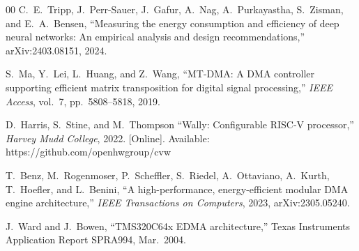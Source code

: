 \documentclass[conference]{IEEEtran}
\begin{document}
\begin{thebibliography}{00}
    C.~E.~Tripp, J.~Perr-Sauer, J.~Gafur, A.~Nag, A.~Purkayastha,
    S.~Zisman, and E.~A.~Bensen, ``Measuring the energy consumption and
    efficiency of deep neural networks: An empirical analysis and design
    recommendations,'' arXiv:2403.08151, 2024.

    S.~Ma, Y.~Lei, L.~Huang, and Z.~Wang, ``MT-DMA: A DMA controller
    supporting efficient matrix transposition for digital signal
    processing,'' \textit{IEEE Access}, vol.~7, pp.~5808--5818, 2019.

    D.~Harris, S.~Stine, and M.~Thompson ``Wally: Configurable
    RISC-V processor,'' \textit{Harvey Mudd College}, 2022. [Online].
    Available: https://github.com/openhwgroup/cvw
    
    T.~Benz, M.~Rogenmoser, P.~Scheffler, S.~Riedel, A.~Ottaviano,
    A.~Kurth, T.~Hoefler, and L.~Benini, ``A high-performance,
    energy-efficient modular DMA engine architecture,'' \textit{IEEE
    Transactions on Computers}, 2023, arXiv:2305.05240.
        
    J.~Ward and J.~Bowen, ``TMS320C64x EDMA architecture,'' Texas
    Instruments Application Report SPRA994, Mar.\ 2004.
\end{thebibliography}
\vspace{12pt}
\end{document}

